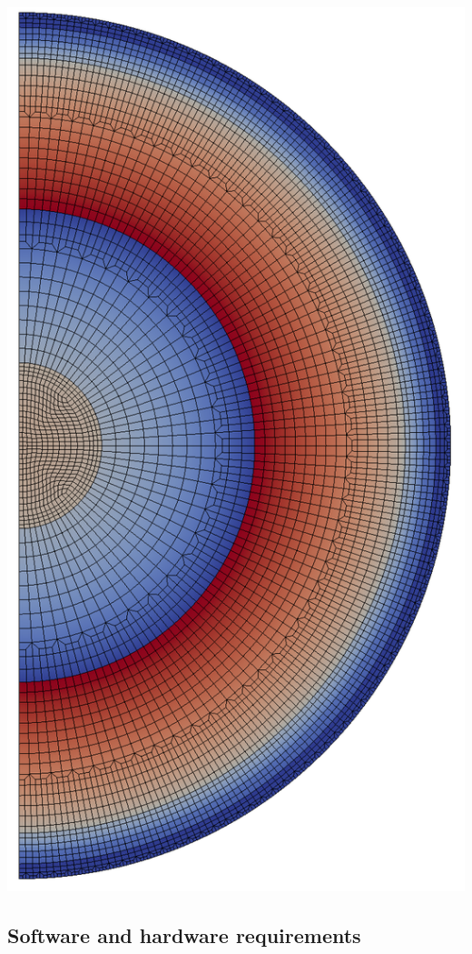 \documentclass{article}
\begin{document}
\begin{center}
\begin{minipage}[t]{0.25\paperwidth}
        \includegraphics[width=.7\textwidth]{mesh.png}
    \end{minipage}%
\end{center}

\newpage
\subsection{Software and hardware requirements}
\end{document}
